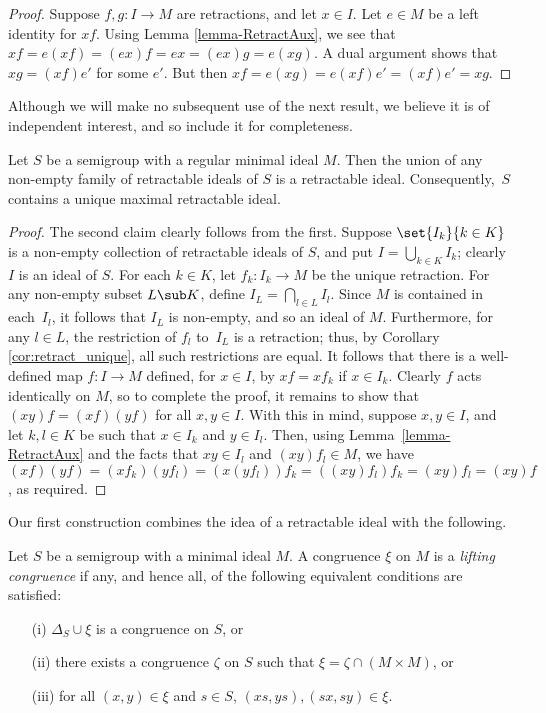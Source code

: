 \begin{proof}
Suppose $f,g:I\to M$ are retractions, and let $x\in I$.  Let $e\in M$ be a
left identity for $xf$.  Using Lemma \ref{lemma-RetractAux}, we see that
$xf = e (xf) = (ex)f = ex = (ex)g = e (xg)$.  A dual argument shows that
$xg=(xf) e'$ for some $e'$.  But then $xf = e (xg) = e (xf)  e' = (xf)e'=xg$.
\end{proof}

Although we will make no subsequent use of the next result, we believe it is of independent interest, and so include it for completeness.


\begin{proposition}
Let $S$ be a semigroup with a regular minimal ideal $M$.  Then the union of any non-empty family of retractable ideals of $S$ is a retractable ideal.  Consequently,~$S$ contains a unique maximal retractable ideal.
\end{proposition}

\begin{proof} The second claim clearly follows from the first.  Suppose $\set{I_k}{k\in K}$ is a non-empty collection of retractable ideals of $S$, and put $I=\bigcup_{k\in K}I_k$; clearly $I$ is an ideal of $S$.  For each $k\in K$, let $f_k:I_k\to M$ be the unique retraction.  For any non-empty subset $L\sub K$, define $I_L=\bigcap_{l\in L}I_l$.  Since $M$ is contained in each~$I_l$, it follows that $I_L$ is non-empty, and so an ideal of $M$.  Furthermore, for any $l\in L$, the restriction of $f_l$ to~$I_L$ is a retraction; thus, by Corollary \ref{cor:retract_unique}, all such restrictions are equal.  It follows that there is a well-defined map $f:I\to M$ defined, for $x\in I$, by $xf=xf_k$ if $x\in I_k$.  Clearly $f$ acts identically on $M$, so to complete the proof, it remains to show that $(xy)f=(xf)(yf)$ for all $x,y\in I$.  With this in mind, suppose $x,y\in I$, and let $k,l\in K$ be such that $x\in I_k$ and $y\in I_l$.  Then, using Lemma~\ref{lemma-RetractAux} and the facts that $xy\in I_l$ and $(xy)f_l\in M$, we have $(xf)(yf) = (xf_k)(yf_l) = (x(yf_l))f_k = ((xy)f_l)f_k = (xy)f_l = (xy)f$, as required.
\end{proof}

Our first construction combines the idea of a retractable ideal with the following.

\newpage

\begin{definition}\label{defn:lift}
Let $S$ be a semigroup with a minimal ideal $M$.  A congruence $\xi$ on $M$ is a \emph{lifting congruence} if any, and hence all, of the following equivalent conditions are satisfied:
\begin{itemize}
\item[(i)] $\Delta_S\cup\xi$ is a congruence on $S$, or
\item[(ii)] there exists a congruence $\zeta$ on $S$ such that $\xi=\zeta\cap(M\times M)$, or
\item[(iii)] for all $(x,y)\in\xi$ and $s\in S$, $(xs,ys),(sx,sy)\in\xi$.
\end{itemize}
\end{definition}

